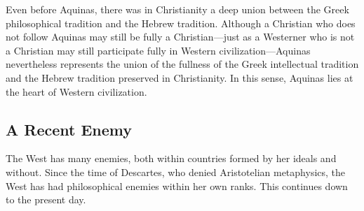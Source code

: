 \documentclass[twocolumn]{article}
\begin{document}
Even before Aquinas, there was in Christianity a deep union between the Greek
philosophical tradition and the Hebrew tradition.  Although a Christian who
does not follow Aquinas may still be fully a Christian---just as a Westerner
who is not a Christian may still participate fully in Western
civilization---Aquinas nevertheless represents the union of the fullness of the
Greek intellectual tradition and the Hebrew tradition preserved in
Christianity.  In this sense, Aquinas lies at the heart of Western
civilization.

\subsection{A Recent Enemy}

The West has many enemies, both within countries formed by her ideals and
without.  Since the time of Descartes, who denied Aristotelian metaphysics, the
West has had philosophical enemies within her own ranks.  This continues down
to the present day.
\end{document}
